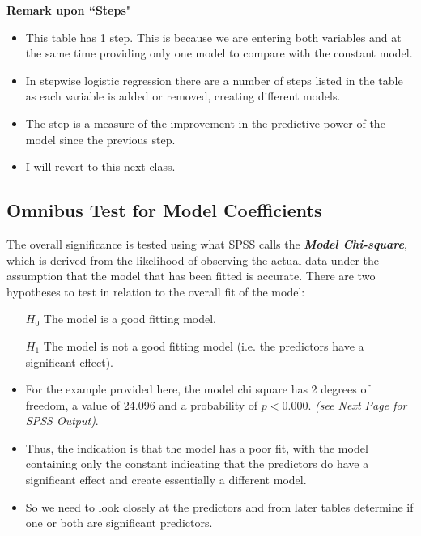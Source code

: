 \documentclass[a4paper,12pt]{article}
\begin{document}
\noindent \textbf{Remark upon ``Steps"}
\begin{itemize}
	\item This table has 1 step. This is because we are entering both variables and at the same
	time providing only one model to compare with the constant model. 
	\item In stepwise logistic regression there are a number of steps listed in the table as each variable is added or
	removed, creating different models. 
	\item The step is a measure of the improvement in the
	predictive power of the model since the previous step. 
	\item I will revert to this next class.
\end{itemize}




\subsection{Omnibus Test for Model Coefficients}
The overall significance is tested using what SPSS calls the \textbf{\textit{Model Chi-square}}, which is derived from the likelihood of observing the actual data under the assumption that the model that has been fitted is accurate. There are two hypotheses to test in relation to the overall fit of the model:

\begin{framed}
	\begin{itemize}
		\item[$H_0$] The model is a good fitting model.
		\item[$H_1$] The model is not a good fitting model (i.e. the predictors have a significant effect).
	\end{itemize}
\end{framed}

\begin{itemize}
	\item For the example provided here, the model chi square has 2 degrees of freedom, a value of 24.096 and a probability of $p < 0.000$. \textit{(see Next Page for SPSS Output)}.
	
	\item Thus, the indication is that the model has a poor fit, with the model containing only the constant indicating that the predictors do have a significant effect and create essentially a different model. 
	\item So we need to look closely at
	the predictors and from later tables determine if one or both are significant predictors.
\end{itemize}
\bigskip
\end{document}
